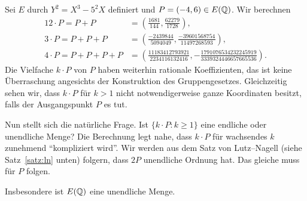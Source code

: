 \begin{beispiel}
  \label{bsp:multiplesofP}
  Sei $E$ durch $Y^2 = X^3-5^2X$ definiert und $P = (-4,6) \in
  E({\mathbb{Q}})$.
  Wir berechnen
  \begin{alignat*}1
    2\cdot P=P+P &= \left(\frac{1681}{144}, \frac{62279}{1728}\right),\\
    3\cdot P=P+P +P &= \left(\frac{-2439844}{5094049}, \frac{-39601568754}{11497268593} \right),\\
    4\cdot P= P+P +P+P &= \left( \frac{11183412793921}{2234116132416}, -\frac{1791076534232245919}{3339324446657665536}\right).
  \end{alignat*}
  Die Vielfache $k\cdot P$ von $P$ haben weiterhin rationale Koeffizienten,
  das ist keine Überraschung angesichts der Konstruktion des
  Gruppengesetzes. Gleichzeitig sehen wir, dass $k\cdot P$ für $k>1$ nicht
  notwendigerweise ganze Koordinaten besitzt, falls der Ausgangspunkt $P$
  es tut.

  Nun stellt sich die natürliche Frage. Ist $\{ k\cdot P : k\ge 1\}$ eine
  endliche oder unendliche Menge? Die Berechnung legt nahe, dass
  $k\cdot P$ für wachsendes $k$ zunehmend ``kompliziert wird''.
  Wir werden aus dem Satz von Lutz--Nagell (siehe Satz~\ref{satz:ln} unten)
  folgern,
  dass $2P$ unendliche
  Ordnung hat. Das gleiche muss für $P$ folgen.

  Insbesondere ist $E({\mathbb{Q}})$ eine unendliche Menge. 
\end{beispiel}


